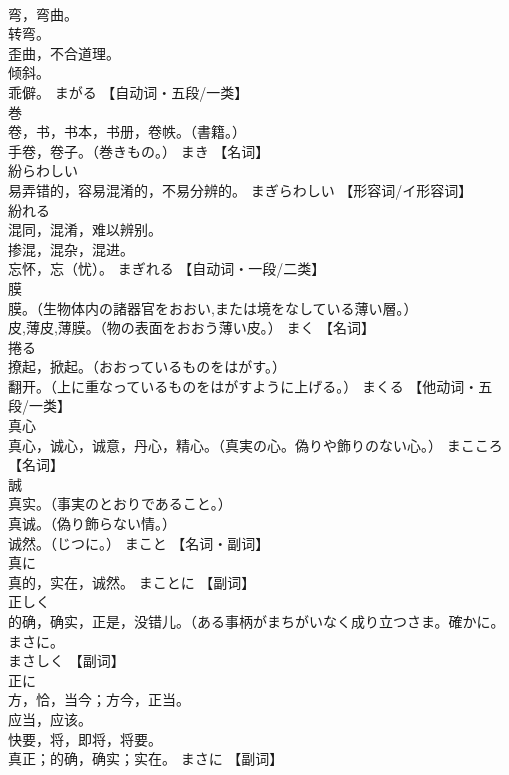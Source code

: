 \documentclass[8pt]{extreport}
\begin{document}
\begin{CJK}{UTF8}{min}
\\	弯，弯曲。 
\\	转弯。 
\\	歪曲，不合道理。 
\\	倾斜。 
\\	乖僻。	まがる		【自动词・五段/一类】
\\	巻	
\\	卷，书，书本，书册，卷帙。（書籍。） 
\\	手卷，卷子。（巻きもの。）	まき		【名词】
\\	紛らわしい	
\\	易弄错的，容易混淆的，不易分辨的。	まぎらわしい		【形容词/イ形容词】
\\	紛れる	
\\	混同，混淆，难以辨别。 
\\	掺混，混杂，混进。 
\\	忘怀，忘（忧）。	まぎれる		【自动词・一段/二类】
\\	膜	
\\	膜。（生物体内の諸器官をおおい,または境をなしている薄い層｡） 
\\	皮,薄皮,薄膜。（物の表面をおおう薄い皮｡）	まく		【名词】
\\	捲る	
\\	撩起，掀起。（おおっているものをはがす。） 
\\	翻开。（上に重なっているものをはがすように上げる。）	まくる		【他动词・五段/一类】
\\	真心	
\\	真心，诚心，诚意，丹心，精心。（真実の心。偽りや飾りのない心。）	まこころ		【名词】
\\	誠	
\\	真实。（事実のとおりであること。） 
\\	真诚。（偽り飾らない情。） 
\\	诚然。（じつに。）	まこと		【名词・副词】
\\	真に	
\\	真的，实在，诚然。	まことに		【副词】
\\	正しく	
\\	的确，确实，正是，没错儿。（ある事柄がまちがいなく成り立つさま。確かに。まさに。 
\\	まさしく		【副词】
\\	正に	
\\	方，恰，当今；方今，正当。 
\\	应当，应该。 
\\	快要，将，即将，将要。 
\\	真正；的确，确实；实在。	まさに		【副词】

\end{CJK}
\end{document}
